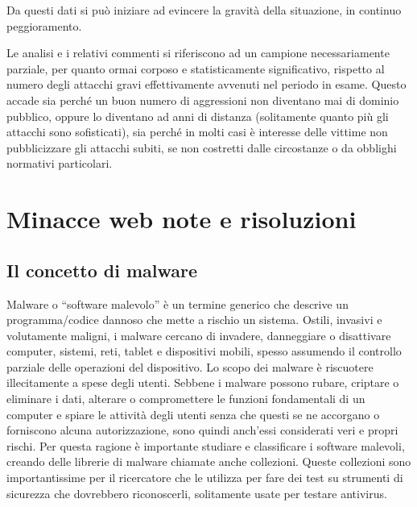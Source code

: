 Da questi dati si può iniziare ad evincere la gravità della situazione, in continuo peggioramento.

Le analisi e i relativi commenti si riferiscono ad un campione necessariamente parziale, per quanto ormai corposo e statisticamente significativo, rispetto al numero degli attacchi gravi effettivamente avvenuti nel periodo in esame. Questo accade sia perché un buon numero di aggressioni non diventano mai di dominio pubblico, oppure lo diventano ad anni di distanza (solitamente quanto più gli attacchi sono sofisticati), sia perché in molti casi è interesse delle vittime non pubblicizzare gli attacchi subiti, se non costretti dalle circostanze o da obblighi normativi particolari.

\chapter{Minacce web note e risoluzioni}
\section{Il concetto di malware}
Malware o “software malevolo” è un termine generico che descrive un programma/codice dannoso che mette a rischio un sistema. Ostili, invasivi e volutamente maligni, i malware cercano di invadere, danneggiare o disattivare computer, sistemi, reti, tablet e dispositivi mobili, spesso assumendo il controllo parziale delle operazioni del dispositivo. Lo scopo dei malware è riscuotere illecitamente a spese degli utenti. Sebbene i malware possono rubare, criptare o eliminare i dati, alterare o compromettere le funzioni fondamentali di un computer e spiare le attività degli utenti senza che questi se ne accorgano o forniscono alcuna autorizzazione, sono quindi anch’essi considerati veri e propri rischi. Per questa ragione è importante studiare e classificare i software malevoli, creando delle librerie di malware chiamate anche collezioni. Queste collezioni sono importantissime per il ricercatore che le utilizza per fare dei test su strumenti di sicurezza che dovrebbero riconoscerli, solitamente usate per testare antivirus.


